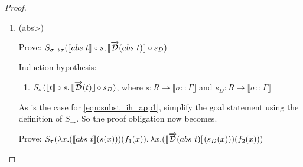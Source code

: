 \documentclass[11pt, final]{article}
\begin{document}
\begin{proof}
\begin{enumerate}
        \begin{align*}
          S&_\tau(\llbracket app\ t_1\ t_2 \rrbracket \circ s, \llbracket \D(app\ t_1\ t_2) \rrbracket \circ s_D) \\
            &\Vdash \text{(Definition of $\D$)}\\
            & S_\tau(\llbracket app\ t_1\ t_2 \rrbracket \circ s, \llbracket app\ \D(t_1)\ \D(t_2) \rrbracket \circ s_D) \\
            &\Vdash \text{(Definition of \circ)}\\
            & S_\tau(\lambda x. \llbracket app\ t_1\ t_2 \rrbracket (s (x)), \lambda x. \llbracket app\ \D(t_1)\ \D(t_2) \rrbracket (s_D (x))) \\
            &\Vdash \text{(Definition of $\llbracket \rrbracket$)}\\
            & S_\tau(\lambda x. (\llbracket t_1\ \rrbracket(s(x))) (\llbracket t_2 \rrbracket(s(x))),\lambda x. (\llbracket \D(t_1)\ \rrbracket(s_D(x))) (\llbracket \D(t_2) \rrbracket(s_D(x))) \\
            &\Vdash \text{(Induction hypothesis \ref{eqn:subst_ih_app1})}\\
            & S_{\sigma}(\lambda x. \llbracket t_2 \rrbracket (s(x)), \lambda x. \llbracket \D(t_2) \rrbracket \circ (s_D(x))) \\
            &\Vdash \text{(Induction hypothesis \ref{eqn:subst_ih_app2})}
        \end{align*} \qed
      \item (\<abs>)

        Prove: $S_{\sigma\rightarrow\tau}(\llbracket abs\ t \rrbracket \circ s, \llbracket \overrightarrow{\mathcal{D}}(abs\ t) \rrbracket \circ s_D)$

        Induction hypothesis:
        \begin{enumerate}
          \item \label{eqn:subst_ih_abs} $S_\sigma(\llbracket t \rrbracket \circ s, \llbracket \overrightarrow{\mathcal{D}}(t) \rrbracket \circ s_D)$, where $s : R \rightarrow \llbracket \sigma::\Gamma \rrbracket$ and $s_D : R \rightarrow \llbracket \sigma::\Gamma \rrbracket$
        \end{enumerate}

        As is the case for \ref{eqn:subst_ih_app1}, simplify the goal statement using the definition of $S_\rightarrow$. So the proof obligation now becomes.

        Prove: $S_{\tau}(\lambda x. (\llbracket abs\ t \rrbracket (s(x)))(f_1(x)), \lambda x. (\llbracket \overrightarrow{\mathcal{D}}(abs\ t) \rrbracket (s_D(x)))(f_2(x)))$


\end{enumerate}
\end{proof}
\end{document}
